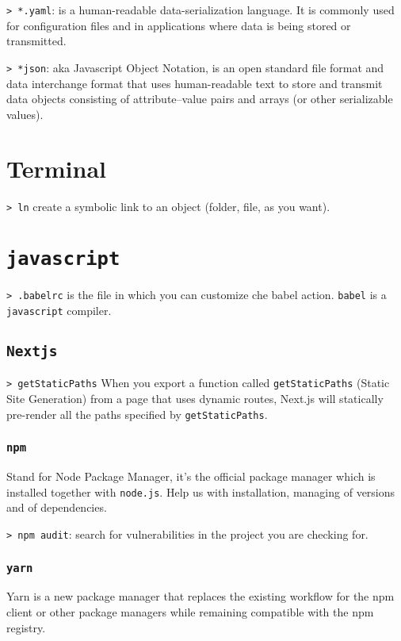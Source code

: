 \documentclass[11pt]{article}
\newcommand{\cmd}[1]{\colorbox{light-gray}{\textcolor{gio}{\texttt{#1}}}}
\begin{document}
\begin{multicols}{2}
\cmd{> *.yaml}: is a human-readable data-serialization language. It is commonly 
used for configuration files and in applications where data is being stored or 
transmitted.

\cmd{> *json}: aka Javascript Object Notation, is an open standard file format 
and data interchange format that uses human-readable text to store and transmit
 data objects consisting of attribute–value pairs and arrays (or other serializable values). 

\section{Terminal}

\cmd{> ln} create a symbolic link to an object (folder, file, as you want).

\section{\texttt{javascript}}

\cmd{> .babelrc} is the file in which you can customize che babel action. 
\texttt{babel} is a \texttt{javascript} compiler.

\subsection{\texttt{Nextjs}}

\cmd{> getStaticPaths} When you export a function called \texttt{getStaticPaths} 
(Static Site Generation) from a page that uses dynamic routes, Next.js will 
statically pre-render all the paths specified by \texttt{getStaticPaths}.

\subsubsection{\texttt{npm}}
Stand for Node Package Manager, it's the official package manager which is 
installed together with \texttt{node.js}. Help us with installation, managing of 
versions and of dependencies.

\cmd{> npm audit}: search for vulnerabilities in the project you are checking for.

\subsubsection{\texttt{yarn}}

Yarn is a new package manager that replaces the existing workflow for the npm 
client or other package managers while remaining compatible with the npm registry. 


\end{multicols}
\end{document}
